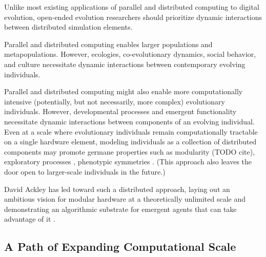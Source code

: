 
Unlike most existing applications of parallel and distributed computing to digital evolution, open-ended evolution researchers should prioritize dynamic interactions between distributed simulation elements.

Parallel and distributed computing enables larger populations and metapopulations.
However, ecologies, co-evolutionary dynamics, social behavior, and culture necessitate dynamic interactions between contemporary evolving individuals.

Parallel and distributed computing might also enable more computationally intensive (potentially, but not necessarily, more complex) evolutionary individuals.
However, developmental processes and emergent functionality necessitate dynamic interactions between components of an evolving individual. %
Even at a scale where evolutionary individuals remain computationally tractable on a single hardware element, modeling individuals as a collection of distributed components may promote germane properties such as modularity (TODO cite), exploratory processes \citep{gerhart2007theory}, phenotypic symmetries \citep{stanley2003taxonomy}. %
(This approach also leaves the door open to larger-scale individuals in the future.)

David Ackley has led toward such a distributed approach, laying out an ambitious vision for modular hardware at a theoretically unlimited scale \citep{ackley2011pursue} and demonstrating an algorithmic substrate for emergent agents that can take advantage of it \citep{ackley2018digital}.

\subsection{A Path of Expanding Computational Scale}


